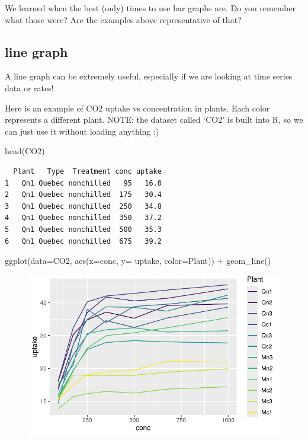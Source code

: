 \documentclass[
  letterpaper,
  DIV=11,
  numbers=noendperiod]{scrartcl}
\newenvironment{Shaded}{\begin{snugshade}}{\end{snugshade}}
\newcommand{\AttributeTok}[1]{\textcolor[rgb]{0.40,0.45,0.13}{#1}}
\newcommand{\FunctionTok}[1]{\textcolor[rgb]{0.28,0.35,0.67}{#1}}
\newcommand{\NormalTok}[1]{\textcolor[rgb]{0.00,0.23,0.31}{#1}}
\newcommand{\SpecialCharTok}[1]{\textcolor[rgb]{0.37,0.37,0.37}{#1}}
\begin{document}
We learned when the best (only) times to use bar graphs are. Do you
remember what those were? Are the examples above representative of that?

\subsection{\texorpdfstring{\textbf{line graph}}{line graph}}

A line graph can be extremely useful, especially if we are looking at
time series data or rates!

Here is an example of CO2 uptake vs concentration in plants. Each color
represents a different plant. NOTE: the dataset called `CO2' is built
into R, so we can just use it without loading anything :)

\begin{Shaded}
\begin{Highlighting}[]
\FunctionTok{head}\NormalTok{(CO2)}
\end{Highlighting}
\end{Shaded}

\begin{verbatim}
  Plant   Type  Treatment conc uptake
1   Qn1 Quebec nonchilled   95   16.0
2   Qn1 Quebec nonchilled  175   30.4
3   Qn1 Quebec nonchilled  250   34.8
4   Qn1 Quebec nonchilled  350   37.2
5   Qn1 Quebec nonchilled  500   35.3
6   Qn1 Quebec nonchilled  675   39.2
\end{verbatim}

\begin{Shaded}
\begin{Highlighting}[]
\FunctionTok{ggplot}\NormalTok{(}\AttributeTok{data=}\NormalTok{CO2, }\FunctionTok{aes}\NormalTok{(}\AttributeTok{x=}\NormalTok{conc, }\AttributeTok{y=}\NormalTok{ uptake, }\AttributeTok{color=}\NormalTok{Plant)) }\SpecialCharTok{+}
  \FunctionTok{geom\_line}\NormalTok{()}
\end{Highlighting}
\end{Shaded}

\begin{figure}[H]

{\centering \includegraphics{Lab_2_files/figure-pdf/unnamed-chunk-13-1.pdf}

}

\end{figure}
\end{document}

